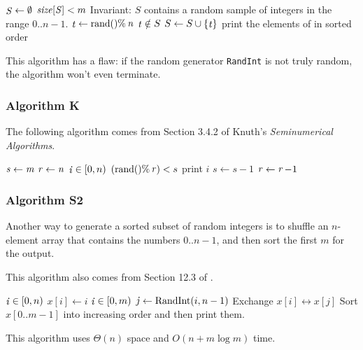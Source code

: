 \documentclass[12pt]{article}
\begin{document}
\begin{codebox}
\li $\id{S} \gets \emptyset$
\li \While $\id{size[S]} < m$
\li \>\Comment Invariant: $S$ contains a random sample of  integers in
\zi \>\> the range $0..n-1$.
\li \Do $\id{t} \gets \func{rand}() \% \id{n}$
\li     \If $\id{t} \notin S$
\li         \Then $S \gets S \cup \{\id{t}\}$
        \End
    \End
\li print the elements of  in sorted order
\end{codebox}

This algorithm has a flaw: if the random generator {\tt RandInt} is not
truly random, the algorithm won't even terminate.

\subsubsection{Algorithm K} 

The following algorithm comes from Section 3.4.2 of Knuth's
\emph{Seminumerical Algorithms}.

\begin{codebox}
\li $\id{s} \gets \id{m}$
\li $\id{r} \gets \id{n}$
\li \For $\id{i} \in [0, n)$
\li     \Do \If $(\func{rand}() \% \id{r}) < s$
\li             \Then print $i$
\li                   $s \gets s - 1$
            \End
\li         $\id{r} \gets \id{r} - \const{1}$
        \End
\end{codebox}

\subsubsection{Algorithm S2}

Another way to generate a sorted subset of random integers is to shuffle an
$n$-element array that contains the numbers $0..n-1$, and then sort the
first $m$ for the output.

This algorithm also comes from Section 12.3 of \cite{bently00}.

\begin{codebox}
\li \For $\id{i} \in [0, n)$
\li \Do $x[i] \gets i$
    \End
\li \For $\id{i} \in [0, m)$
\li \Do $\id{j} \gets \func{RandInt}(i, n-1)$
\li     Exchange $x[i] \longleftrightarrow x[j]$
    \End
\li Sort $x[0..m-1]$ into increasing order and then print them.
\end{codebox}

This algorithm uses $\Theta(n)$ space and $O(n+m\log{m})$ time.
\end{document}
